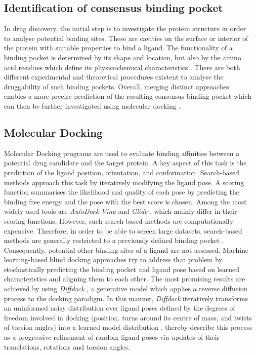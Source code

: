 \documentclass[11pt, letterpaper, titlepage]{article}
\renewcommand{\cite}{\parencite}
\begin{document}
\subsection{Identification of consensus binding pocket}
In drug discovery, the initial step is to investigate the protein structure in order to analyse potential binding sites. These are cavities on the surface or interior of the protein with suitable properties to bind a ligand. The functionality of a binding pocket is determined by its shape and location, but also by the amino acid residues which define its physicochemical characteristics \cite{Stank_2016}. 
There are both different experimental and theoretical procedures existent to analyse the druggability of such binding pockets. Overall, merging distinct approaches enables a more precise prediction of the resulting consensus binding pocket which can then be further investigated using molecular docking \cite{Ricci_2022}. 


\subsection{Molecular Docking}
Molecular Docking programs are used to evaluate binding affinities between a potential drug candidate and the target protein. A key aspect of this task is the prediction of the ligand position, orientation, and conformation. Search-based methods approach this task by iteratively modifying the ligand pose. A scoring function summarises the likelihood and quality of each pose by predicting the binding free energy and the pose with the best score is chosen. Among the most widely used tools are \textit{AutoDock Vina} \cite{Trott.2010} and \textit{Glide} \cite{Halgren.2004}, which mainly differ in their scoring functions. However, such search-based methods are computationally expensive. Therefore, in order to be able to screen large datasets, search-based methods are generally restricted to a previously defined binding pocket \cite{Corso.2022}. Consequently, potential other binding sites of a ligand are not assessed. Machine learning-based blind docking approaches try to address that problem by stochastically predicting the binding pocket and ligand pose based on learned characteristics and aligning them to each other. The most promising results are achieved by using \textit{Diffdock} \cite{Corso.2022}, a generative model which applies a reverse diffusion process to the docking paradigm. In this manner, \textit{Diffdock} iteratively transforms an uninformed noisy distribution over ligand poses defined by the degrees of freedom involved in docking (position, turns around its centre of mass, and twists of torsion angles) into a learned model distribution \cite{Corso.2022}. \citeauthor{Corso.2022} thereby describe this process as a progressive refinement of random ligand poses via updates of their translations, rotations and torsion angles.
\end{document}
